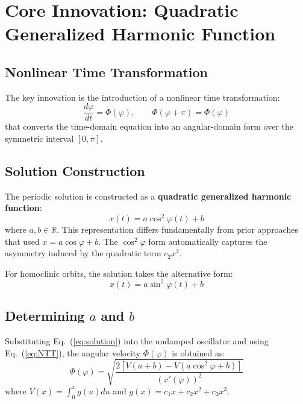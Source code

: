 \documentclass[11pt,a4paper]{article}
\begin{document}
\section{Core Innovation: Quadratic Generalized Harmonic Function}

\subsection{Nonlinear Time Transformation}

The key innovation is the introduction of a nonlinear time transformation:
\begin{equation}
\frac{d\varphi}{dt} = \Phi(\varphi), \qquad \Phi(\varphi + \pi) = \Phi(\varphi)
\label{eq:NTT}
\end{equation}
that converts the time-domain equation into an angular-domain form over the symmetric interval $[0, \pi]$.

\subsection{Solution Construction}

The periodic solution is constructed as a \textbf{quadratic generalized harmonic function}:
\begin{equation}
\boxed{x(t) = a \cos^2\varphi(t) + b}
\label{eq:solution}
\end{equation}
where $a, b \in \mathbb{R}$. This representation differs fundamentally from prior approaches that used $x = a\cos\varphi + b$. The $\cos^2\varphi$ form automatically captures the asymmetry induced by the quadratic term $c_2 x^2$.

For homoclinic orbits, the solution takes the alternative form:
\begin{equation}
x(t) = a \sin^2\varphi(t) + b
\label{eq:homoclinic}
\end{equation}

\subsection{Determining $a$ and $b$}

Substituting Eq.~(\ref{eq:solution}) into the undamped oscillator and using Eq.~(\ref{eq:NTT}), the angular velocity $\Phi(\varphi)$ is obtained as:
\begin{equation}
\Phi(\varphi) = \sqrt{\frac{2[V(a+b) - V(a\cos^2\varphi + b)]}{(x'(\varphi))^2}}
\label{eq:Phi}
\end{equation}
where $V(x) = \int_0^x g(u)du$ and $g(x) = c_1 x + c_2 x^2 + c_3 x^3$.
\end{document}
